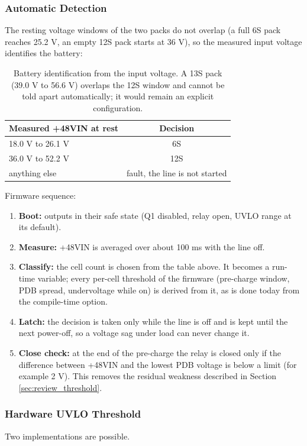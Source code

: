 \documentclass[11pt,a4paper]{article}
\begin{document}
\subsubsection{Automatic Detection}
The resting voltage windows of the two packs do not overlap (a full 6S pack reaches 25.2 V, an empty 12S pack starts at 36 V), so the measured input voltage identifies the battery:

\begin{table}[H]
\centering
\begin{tabular}{lc}
\toprule
Measured +48VIN at rest & Decision \\
\midrule
18.0 V to 26.1 V & 6S \\
36.0 V to 52.2 V & 12S \\
anything else & fault, the line is not started \\
\bottomrule
\end{tabular}
\caption{Battery identification from the input voltage. A 13S pack (39.0 V to 56.6 V) overlaps the 12S window and cannot be told apart automatically; it would remain an explicit configuration.}
\end{table}

Firmware sequence:
\begin{enumerate}
    \item \textbf{Boot:} outputs in their safe state (Q1 disabled, relay open, UVLO range at its default).
    \item \textbf{Measure:} +48VIN is averaged over about 100 ms with the line off.
    \item \textbf{Classify:} the cell count is chosen from the table above. It becomes a run-time variable; every per-cell threshold of the firmware (pre-charge window, PDB spread, undervoltage while on) is derived from it, as is done today from the compile-time option.
    \item \textbf{Latch:} the decision is taken only while the line is off and is kept until the next power-off, so a voltage sag under load can never change it.
    \item \textbf{Close check:} at the end of the pre-charge the relay is closed only if the difference between +48VIN and the lowest PDB voltage is below a limit (for example 2 V). This removes the residual weakness described in Section \ref{sec:review_threshold}.
\end{enumerate}

\subsubsection{Hardware UVLO Threshold}
Two implementations are possible.
\end{document}
